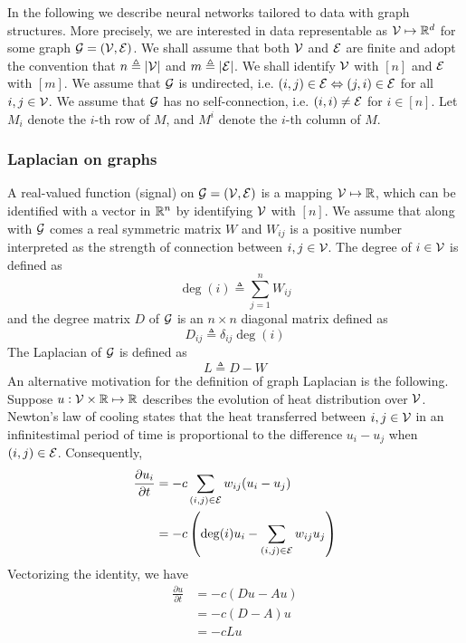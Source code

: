 \documentclass{article}
\DeclareMathOperator{\degree}{deg}
\newcommand{\pp}[2]{{\frac{\partial {#1}}{\partial {#2}}}}
\begin{document}
In the following we describe neural networks tailored to data with graph structures.
More precisely, we are interested in data representable as ${\mathcal V} \mapsto {\mathbb R}^d$ for some graph ${\mathcal G} = ({\mathcal V}, {\mathcal E})$.
We shall assume that both ${\mathcal V}$ and ${\mathcal E}$ are finite and adopt the convention that $n \triangleq |{\mathcal V}|$ and $m \triangleq |{\mathcal E}|$.
We shall identify ${\mathcal V}$ with $[n]$ and ${\mathcal E}$ with $[m]$.
We assume that ${\mathcal G}$ is undirected, i.e. $(i, j) \in {\mathcal E} \Leftrightarrow (j, i) \in {\mathcal E}$ for all $i, j \in {\mathcal V}$.
We assume that ${\mathcal G}$ has no self-connection, i.e. $(i, i) \ne {\mathcal E}$ for $i \in [n]$.
Let $M_i$ denote the $i$-th row of $M$, and $M^i$ denote the $i$-th column of $M$.

\subsubsection{Laplacian on graphs}

A real-valued function (signal) on ${\mathcal G} = ({\mathcal V}, {\mathcal E})$ is a mapping ${\mathcal V} \mapsto {\mathbb R}$, which can be identified with a vector in ${\mathbb R}^n$ by identifying ${\mathcal V}$ with $[n]$.
We assume that along with ${\mathcal G}$ comes a real symmetric matrix $W$ and $W_{i j}$ is a positive number interpreted as the strength of connection between $i, j \in {\mathcal V}$.
The degree of $i \in {\mathcal V}$ is defined as
\[
\degree (i) \triangleq \sum_{j = 1}^n W_{i j}
\]
and the degree matrix $D$ of ${\mathcal G}$ is an $n \times n$ diagonal matrix defined as
\[
D_{i j} \triangleq \delta_{i j} \degree (i)
\]
The Laplacian of ${\mathcal G}$ is defined as
\[
L \triangleq D - W
\]
An alternative motivation for the definition of graph Laplacian is the following.
Suppose $u: {\mathcal V} \times {\mathbb R} \mapsto {\mathbb R}$ describes the evolution of heat distribution over ${\mathcal V}$.
Newton's law of cooling states that the heat transferred between $i, j \in {\mathcal V}$ in an infinitestimal period of time is proportional to the difference $u_i - u_j$ when $(i, j) \in {\mathcal E}$.
Consequently,
\begin{align*}
\pp{u_i}{t}
& = -c \sum_{(i, j) \in \cale} w_{i j} (u_i - u_j) \\
& = -c \left(\degree (i) u_i - \sum_{(i, j) \in \cale} w_{i j} u_j\right)
\end{align*}
Vectorizing the identity, we have
\begin{align*}
\pp{u}{t}
& = -c (D u - A u) \\
& = -c (D - A) u \\
& = -c L u
\end{align*}
\end{document}
